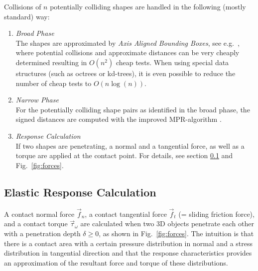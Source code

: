 Collisions of $n$ potentially colliding shapes are handled in the following (mostly standard) way:
\begin{enumerate}
	\item[1. ] \emph{Broad Phase}\\
	The shapes are approximated by \emph{Axis Aligned Bounding Boxes}, see e.g.\ \cite{bergen2003},
    where potential collisions and approximate distances can be very cheaply determined
	resulting in $O(n^2)$ cheap tests. When using special data structures (such as octrees or kd-trees),
	it is even possible to reduce the number of cheap tests to $O(n \log(n))$.
	
	\item[2. ] \emph{Narrow Phase}\\
	For the potentially colliding shape pairs as identified in the broad phase,
	the signed distances are computed with the improved MPR-algorithm \cite{Neumayr2017}.
	
	\item[3. ] \emph{Response Calculation} \\
	If two shapes are penetrating, a normal and a tangential force, as well as a torque are applied at the
	contact point. For details, see section \ref{sec:responseCalculation} and 
    Fig.~\ref{fig:forces}.
\end{enumerate}


\subsection{Elastic Response Calculation}\label{sec:responseCalculation}

A contact normal force $\vec{f}_n$, a contact tangential force $\vec{f}_t$ (= sliding friction force), 
and a contact torque $\vec{\tau}_{\omega}$ are calculated when two 3D objects penetrate each other with a 
penetration depth $\delta \ge 0$, as shown in Fig.~\ref{fig:forces}. The intuition is that
there is a contact area with a certain pressure distribution in normal and a stress
distribution in tangential direction and that the response characteristics provides an
approximation of the resultant force and torque of these distributions.
%

